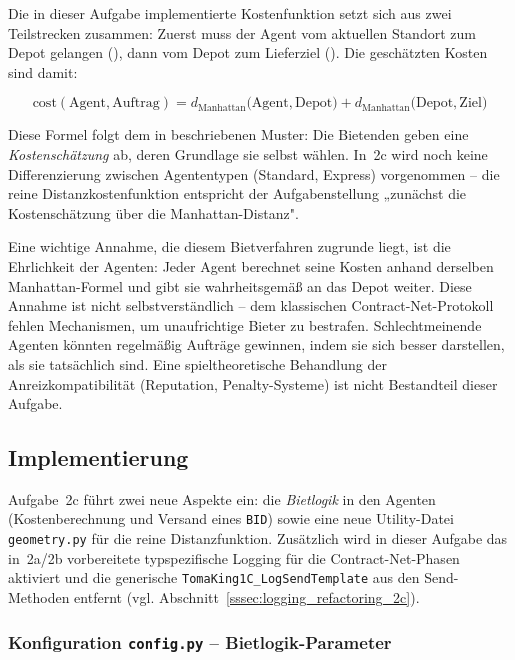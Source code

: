 Die in dieser Aufgabe implementierte Kostenfunktion setzt sich aus zwei Teilstrecken zusammen: Zuerst muss der Agent vom aktuellen Standort zum Depot gelangen (), dann vom Depot zum Lieferziel (). Die geschätzten Kosten sind damit:

\[
\text{cost}(\text{Agent}, \text{Auftrag}) = d_{\text{Manhattan}}\bigl(\text{Agent}, \text{Depot}\bigr) + d_{\text{Manhattan}}\bigl(\text{Depot}, \text{Ziel}\bigr)
\]

Diese Formel folgt dem in \textcite[S. 30\,f.]{5} beschriebenen Muster: Die Bietenden geben eine \textit{Kostenschätzung} ab, deren Grundlage sie selbst wählen. In~2c wird noch keine Differenzierung zwischen Agententypen (Standard, Express) vorgenommen -- die reine Distanzkostenfunktion entspricht der Aufgabenstellung „zunächst die Kostenschätzung über die Manhattan-Distanz".

Eine wichtige Annahme, die diesem Bietverfahren zugrunde liegt, ist die Ehrlichkeit der Agenten: Jeder Agent berechnet seine Kosten anhand derselben Manhattan-Formel und gibt sie wahrheitsgemäß an das Depot weiter. Diese Annahme ist nicht selbstverständlich -- dem klassischen Contract-Net-Protokoll fehlen Mechanismen, um unaufrichtige Bieter zu bestrafen. Schlechtmeinende Agenten könnten regelmäßig Aufträge gewinnen, indem sie sich besser darstellen, als sie tatsächlich sind. Eine spieltheoretische Behandlung der Anreizkompatibilität (Reputation, Penalty-Systeme) ist nicht Bestandteil dieser Aufgabe.

\subsection{Implementierung}

Aufgabe~2c führt zwei neue Aspekte ein: die \textit{Bietlogik} in den Agenten (Kostenberechnung und Versand eines \texttt{BID}) sowie eine neue Utility-Datei \texttt{geometry.py} für die reine Distanzfunktion. Zusätzlich wird in dieser Aufgabe das in~2a/2b vorbereitete typspezifische Logging für die Contract-Net-Phasen aktiviert und die generische \texttt{TomaKing1C\_LogSendTemplate} aus den Send-Methoden entfernt (vgl. Abschnitt~\ref{sssec:logging_refactoring_2c}).


\subsubsection{Konfiguration \texttt{config.py} – Bietlogik-Parameter}

